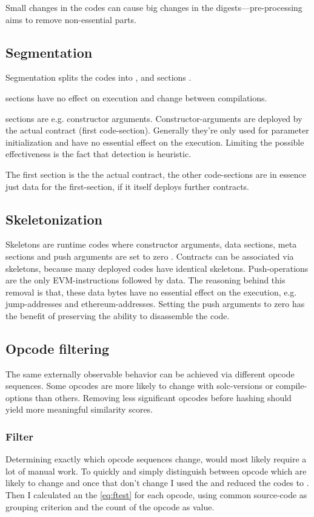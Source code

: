 \documentclass[../main.tex]{subfiles}
\begin{document}
Small changes in the codes can cause big changes in the digests---pre-processing aims to remove non-essential parts.

\subsection{Segmentation \label{sec:seg}}
Segmentation splits the codes into ,  and  sections \cite{ethutils}.

 sections have no effect on execution and change between compilations.

 sections are e.g. constructor arguments.
Constructor-arguments are deployed by the actual contract (first code-section).
Generally they're only used for parameter initialization and have no essential effect on the execution.
Limiting the possible effectiveness is the fact that detection is heuristic.

The first  section is the the actual contract, the other code-sections are in essence just data for the first-section, if it itself deploys further contracts.

\subsection{Skeletonization \label{sec:skel}}
Skeletons are runtime codes where constructor arguments, data sections, meta sections and push arguments are set to zero \cite{ethutils}.
Contracts can be associated via skeletons, because many deployed codes have identical skeletons.
Push-operations are the only EVM-instructions followed by data.
The reasoning behind this removal is that, these data bytes have no essential effect on the execution, e.g. jump-addresses and ethereum-addresses.
Setting the push arguments to zero has the benefit of preserving the ability to disassemble the code.

\subsection{Opcode filtering}
The same externally observable behavior can be achieved via different opcode sequences.
Some opcodes are more likely to change with solc-versions or compile-options than others.
Removing less significant opcodes before hashing should yield more meaningful similarity scores.

\subsubsection{ Filter \cite{ethereum-contract-similarity} \label{sec:fStat}}
Determining exactly which opcode sequences change, would most likely require a lot of manual work.
To quickly and simply distinguish between opcode which are likely to change and once that don't change I used the \n{\solcts}  and reduced the codes to  . Then I calculated an the  \eqref{eq:ftest} for each opcode, using common source-code as grouping criterion and the count of the opcode as value.
\end{document}

